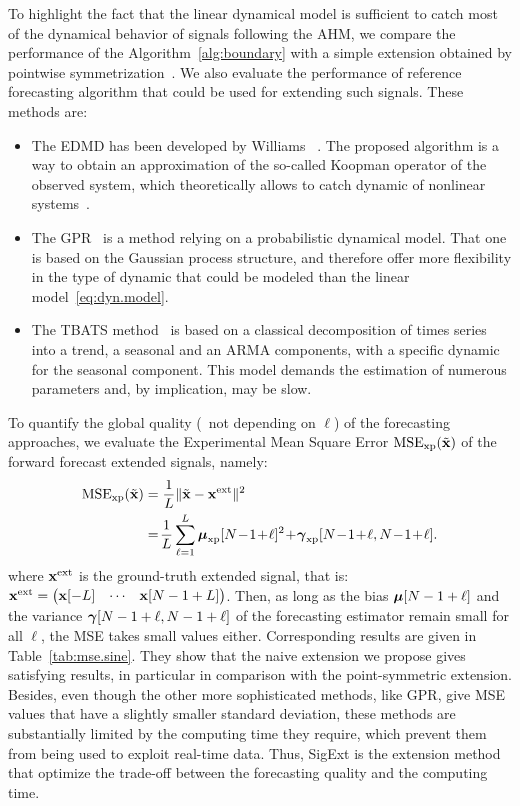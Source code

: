 To highlight the fact that the linear dynamical model is sufficient to catch most of the dynamical behavior of signals following the AHM, we compare the performance of the Algorithm~\ref{alg:boundary} with a simple extension obtained by pointwise symmetrization~\cite{Kharitonenko02wavelet}. We also evaluate the performance of reference forecasting algorithm that could be used for extending such signals. These methods are:
\begin{itemize}
\item The EDMD has been developed by Williams \etal~\cite{Williams15data}. The proposed algorithm is a way to obtain an approximation of the so-called Koopman operator of the observed system, which theoretically allows to catch dynamic of nonlinear systems~\cite{Korda18linear}.
\item The GPR~\cite{Rasmussen06gaussian} is a method relying on a probabilistic dynamical model. That one is based on the Gaussian process structure, and therefore offer more flexibility in the type of dynamic that could be modeled than the linear model~\eqref{eq:dyn.model}.
\item The TBATS method~\cite{DeLivera11forecasting} is based on a classical decomposition of times series into a trend, a seasonal and an ARMA components, with a specific dynamic for the seasonal component. This model demands the estimation of numerous parameters and, by implication, may be slow. 
\end{itemize}

To quantify the global quality (\ie~not depending on $\ell$) of the forecasting approaches, we evaluate the Experimental Mean Square Error $\mathrm{MSE_{xp}}(\tilde{{\mathbf x}})$ of the forward forecast extended signals, namely:
\begin{align}
\label{eq:mse}
\mathrm{MSE_{\xp}}(\tilde\bx) &= \dfrac1{L}\|\tilde\bx -\bx^\mathrm{ext}\|^2 \\
\nonumber
&=\! \dfrac1{L}\sum_{\ell=1}^L \bmu_{\xp}[N\!-\!1\!+\!\ell]^2 \!+\! \bgamma_{\xp}[N\!-\!1\!+\!\ell,N\!-\!1\!+\!\ell] .
\end{align}
where ${\mathbf x}^\mathrm{ext}$ is the ground-truth extended signal, that is: ${\mathbf x}^\mathrm{ext} = \begin{pmatrix}{\mathbf x}[-L] & \cdots & {\mathbf x}[N-1+L] \end{pmatrix}$. Then, as long as the bias $\boldsymbol{\mu}[N-1+\ell]$ and the variance $\boldsymbol{\gamma}[N-1+\ell,N-1+\ell]$ of the forecasting estimator remain small for all $\ell$, the MSE takes small values either. Corresponding results are given in Table~\ref{tab:mse.sine}. They show that the naive extension we propose gives satisfying results, in particular in comparison with the point-symmetric extension. Besides, even though the other more sophisticated methods, like GPR, give MSE values that have a slightly smaller standard deviation, these methods are substantially limited by the computing time they require, which prevent them from being used to exploit real-time data. Thus, {\sf SigExt} is the extension method that optimize the trade-off between the forecasting quality and the computing time. %

